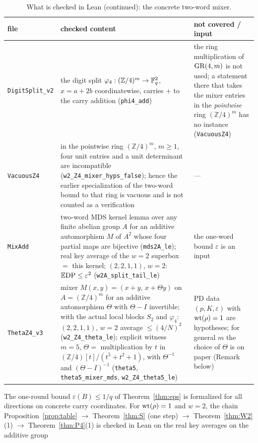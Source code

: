 \begin{table}[!htbp]\footnotesize
\caption{What is checked in Lean (continued): the concrete two-word mixer.}\label{tab:lean3}
\begin{tabular}{p{}p{}p{}}
\toprule
file & checked content & not covered / input\\
\midrule
\texttt{DigitSplit\_v2} & the digit split $\varphi_4:(\mathbb Z/4)^m\to\mathbb{F}_q^2$, $x=a+2b$ coordinatewise, carries $+$ to the carry addition (\texttt{phi4\_add}) & the ring multiplication of $\mathrm{GR}(4,m)$ is not used; a statement there that takes the mixer entries in the \emph{pointwise} ring $(\mathbb Z/4)^m$ has no instance (\texttt{VacuousZ4})\\
\texttt{VacuousZ4} & in the pointwise ring $(\mathbb Z/4)^m$, $m\ge1$, four unit entries and a unit determinant are incompatible (\texttt{w2\_Z4\_mixer\_hyps\_false}); hence the earlier specialization of the two-word bound to that ring is vacuous and is not counted as a verification & ---\\
\texttt{MixAdd} & two-word MDS kernel lemma over any finite abelian group $A$ for an additive automorphism $M$ of $A^2$ whose four partial maps are bijective (\texttt{mds2A\_le}); real key average of the $w=2$ superbox $=$ this kernel; $(2,2,1,1)$, $w=2$: $\mathbb{E}\mathrm{DP}\le\varepsilon^2$ (\texttt{w2A\_split\_tail\_le}) & the one-word bound $\varepsilon$ is an input\\
\texttt{ThetaZ4\_v3} & mixer $M(x,y)=(x+y,\,x+\Theta y)$ on $A=(\mathbb Z/4)^m$ for an additive automorphism $\Theta$ with $\Theta-I$ invertible; with the actual local blocks $S_2$ and $\varphi_4$: $(2,2,1,1)$, $w=2$ average $\le(4/N)^2$ (\texttt{w2\_Z4\_theta\_le}); explicit witness $m=5$, $\Theta=$ multiplication by $t$ in $(\mathbb Z/4)[t]/(t^5+t^2+1)$, with $\Theta^{-1}$ and $(\Theta-I)^{-1}$ (\texttt{theta5}, \texttt{theta5\_mixer\_mds}, \texttt{w2\_Z4\_theta5\_le}) & PD data $(p,K,\varepsilon)$ with $\mathrm{wt}(\rho)=1$ are hypotheses; for general $m$ the choice of $\Theta$ is on paper (Remark below)\\
\bottomrule
\end{tabular}
\end{table}
The one-round bound $\varepsilon(B)\le1/q$ of Theorem~\ref{thm:eps} is formalized for all directions on concrete
carry coordinates. For $\mathrm{wt}(\rho)=1$ and $w=2$, the chain Proposition~\ref{prop:table} $\to$ Theorem~\ref{thm:S} (one step) $\to$
Theorem~\ref{thm:W2}(1) $\to$ Theorem~\ref{thm:P4}(1) is checked in Lean on the real key averages on the additive group
